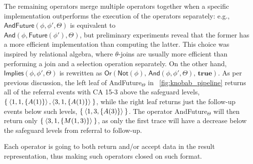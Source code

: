 The remaining operators merge multiple operators together when 
a specific implementation outperforms
the execution of the operators separately:
 e.g., $\textsf{AndFuture}(\phi,\phi',\Theta)$ is equivalent to\\ $\textsf{And}(\phi,\textsf{Future}(\phi'),\Theta)$, but preliminary experiments reveal that the former has a more efficient implementation than computing the latter. This choice was inspired by relational algebra, where $\theta$-joins are usually more efficient than performing a join and a selection operation separately.
 On the other hand, %
 $\textsf{Implies}(\phi,\phi',\Theta)$ is rewritten as $\textsf{Or}(\textsf{Not}(\phi),\,\textsf
{And}(\phi,\phi',\Theta),\,\textbf{true})$. As per previous discussion, the left leaf of \textsf{AndFuture}$_\Theta$ in \figurename~\ref{fig:knobab_pipeline} returns all of the referral events with CA 15-3 above the safeguard levels, $\Set{\braket{1,1,\{A(1)\}},\braket{3,1,\{A(1)\}}}$, while the right leaf returns just the follow-up events below such levels, $\Set{\braket{1,3,\{A(3)\}}}$. The operator \textsf{AndFuture}$_\Theta$ will then return only $\Set{\braket{3,1,\{M(1,3)\}}}$, as only the first trace will have a decrease below the safeguard levels from referral to follow-up.


Each \xLTLf operator is going to both return and/or accept data in the result representation, thus making such operators closed on such format.





